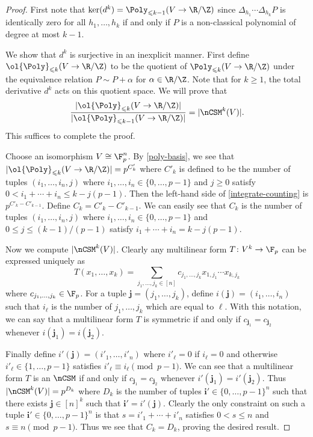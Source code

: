 \begin{proof}
First note that $\ker(d^k)=\Poly_{\leqslant k-1}(V\to\R/\Z)$ since $\Delta_{h_1}\cdots \Delta_{h_k}P$ is identically zero for all $h_1,\ldots, h_k$ if and only if $P$ is a non-classical polynomial of degree at most $k-1$.

We show that $d^k$ is surjective in an inexplicit manner. First define $\ol{\Poly}_{\leqslant k}(V\to\R/\Z)$ to be the quotient of $\Poly_{\leqslant k}(V\to\R/\Z)$ under the equivalence relation $P\sim P+\alpha$ for $\alpha\in\R/\Z$. Note that for $k\geq 1$, the total derivative $d^k$ acts on this quotient space. We will prove that \begin{equation}
\label{integrate-counting}
\frac{|\ol{\Poly}_{\leqslant k}(V\to\R/\Z)|}{|\ol{\Poly}_{\leqslant k-1}(V\to\R/\Z)|}=|\nCSM^k(V)|.
\end{equation}
This suffices to complete the proof.

Choose an isomorphism $V\cong\F_p^n$. By \cref{poly-basis}, we see that $|\ol{\Poly}_{\leqslant k}(V\to\R/\Z)|=p^{C'_k}$ where $C'_k$ is defined to be the number of tuples $(i_1,\ldots,i_n,j)$ where $i_1,\ldots, i_n\in\{0,\ldots, p-1\}$ and $j\geq 0$ satisfy $0<i_1+\cdots+i_n\leq k-j(p-1)$. Then the left-hand side of \cref{integrate-counting} is $p^{C'_k-C'_{k-1}}$. Define $C_k=C'_k-C'_{k-1}$. We can easily see that $C_k$ is the number of tuples $(i_1,\ldots,i_n,j)$ where $i_1,\ldots, i_n\in\{0,\ldots, p-1\}$ and $0\leq j\leq (k-1)/(p-1)$ satisfy $i_1+\cdots+i_n= k-j(p-1)$. 

Now we compute $|\nCSM^k(V)|$. Clearly any multilinear form $T\colon V^k\to\F_p$ can be expressed uniquely as \[T(x_1,\ldots, x_k)=\sum_{j_1,\ldots, j_k\in[n]}c_{j_1,\ldots, j_k}x_{1,j_1}\cdots x_{k,j_k}\]where $c_{j_1,\ldots,j_k}\in\F_p$. For a tuple $\bm j=(j_1,\ldots, j_k)$, define $i(\bm j)=(i_1,\ldots, i_n)$ such that $i_\ell$ is the number of $j_1,\ldots, j_k$ which are equal to $\ell$. With this notation, we can say that a multilinear form $T$ is symmetric if and only if $c_{\bm j_1}=c_{\bm j_2}$ whenever $i(\bm j_1)=i(\bm j_2)$.

Finally define $i'(\bm j)=(i'_1,\ldots, i'_n)$ where $i'_\ell=0$ if $i_\ell=0$ and otherwise $i'_\ell\in\{1,\ldots, p-1\}$ satisfies $i'_{\ell}\equiv i_{\ell}\pmod{p-1}$. We can see that a multilinear form $T$ is an $\nCSM$ if and only if $c_{\bm j_1}=c_{\bm j_2}$ whenever $i'(\bm j_1)=i'(\bm j_2)$. Thus $|\nCSM^k(V)|=p^{D_k}$ where $D_k$ is the number of tuples $\bm i'\in\{0,\ldots,p-1\}^n$ such that there exists $\bm j\in[n]^k$ such that $\bm i'=i'(\bm j)$. Clearly the only constraint on such a tuple $\bm i'\in\{0,\ldots,p-1\}^n$ is that $s=i'_1+\cdots +i'_n$ satisfies $0<s\leq n$ and $s\equiv n\pmod{p-1}$. Thus we see that $C_k=D_k$, proving the desired result.
\end{proof}

